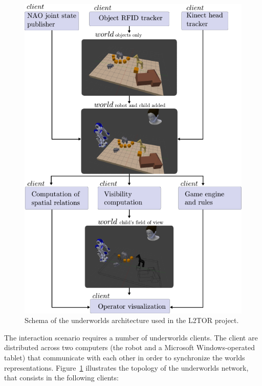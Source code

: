\documentclass[letterpaper, 10 pt, conference]{ieeeconf}  %
\newcommand{\uwds}{{\sc underworlds}\xspace}
\begin{document}
\begin{figure}
    \centering
    \includegraphics[width=0.9\linewidth]{l2tor}
    \caption{Schema of the \uwds architecture used in the L2TOR project. }
    \label{fig|l2torarchitecture}
\end{figure}

The interaction scenario requires a number of \uwds clients. The client are
distributed across two computers (the robot and a Microsoft Windows-operated
tablet) that communicate with each other in order to synchronize the worlds
representations. Figure~\ref{fig|l2torarchitecture} illustrates the topology of
the \uwds network, that consists in the following clients:
\end{document}

